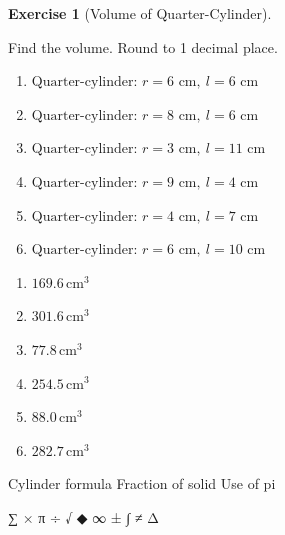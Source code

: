 \documentclass[
  letterpaper,
  DIV=11,
  numbers=noendperiod]{scrreprt}
\theoremstyle{definition}
\newtheorem{exercise}{Exercise}[chapter]
\theoremstyle{remark}
\begin{document}
\begin{exercise}[Volume of
Quarter-Cylinder]\protect\hypertarget{exr-vol-9}{}\label{exr-vol-9}

Find the volume. Round to 1 decimal place.

\begin{enumerate}
\def\labelenumi{\alph{enumi})}
\item
  \(\text{Quarter-cylinder: }r=6\text{ cm},\ l=6\text{ cm}\)
\item
  \(\text{Quarter-cylinder: }r=8\text{ cm},\ l=6\text{ cm}\)
\item
  \(\text{Quarter-cylinder: }r=3\text{ cm},\ l=11\text{ cm}\)
\item
  \(\text{Quarter-cylinder: }r=9\text{ cm},\ l=4\text{ cm}\)
\item
  \(\text{Quarter-cylinder: }r=4\text{ cm},\ l=7\text{ cm}\)
\item
  \(\text{Quarter-cylinder: }r=6\text{ cm},\ l=10\text{ cm}\)
\end{enumerate}

\begin{tcolorbox}[enhanced jigsaw, opacitybacktitle=0.6, coltitle=black, arc=.35mm, colframe=quarto-callout-tip-color-frame, colback=white, bottomrule=.15mm, left=2mm, colbacktitle=quarto-callout-tip-color!10!white, titlerule=0mm, opacityback=0, title=\textcolor{quarto-callout-tip-color}{\faLightbulb}\hspace{0.5em}{🔍 View Solution}, leftrule=.75mm, breakable, rightrule=.15mm, bottomtitle=1mm, toptitle=1mm, toprule=.15mm]

\begin{enumerate}
\def\labelenumi{\alph{enumi})}
\item
  \(169.6\,\text{cm}^{3}\)
\item
  \(301.6\,\text{cm}^{3}\)
\item
  \(77.8\,\text{cm}^{3}\)
\item
  \(254.5\,\text{cm}^{3}\)
\item
  \(88.0\,\text{cm}^{3}\)
\item
  \(282.7\,\text{cm}^{3}\)
\end{enumerate}

\end{tcolorbox}

{Cylinder formula} {Fraction of solid} {Use of pi}

\end{exercise}

∑ × π ÷ √ ◆ ∞ ± ∫ ≠ Δ
\end{document}
